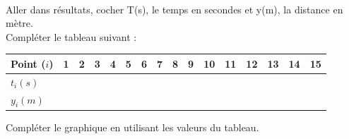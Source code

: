 \documentclass[11pt,a4paper]{article}
\renewcommand{\arraystretch}{1.5}
\begin{document}
\vfill 


\newpage


\\
 Aller dans résultats, cocher T(s), le temps en secondes et y(m), la distance en mètre. \\Compléter le tableau suivant : 

\begin{center}
    
\renewcommand{\arraystretch}{1.8}
    \begin{tabular}{|C{3cm}||C{0.5cm}|C{0.5cm}|C{0.5cm}|C{0.5cm}|C{0.5cm}|C{0.5cm}|C{0.5cm}|C{0.5cm}|C{0.5cm}|C{0.5cm}|C{0.5cm}|C{0.5cm}|C{0.5cm}|C{0.5cm}|C{0.5cm}|}
         \hline
         Point ($i$) & 1 &  2& 3 & 4 & 5 & 6& 7& 8& 9 & 10& 11 & 12 & 13 & 14 & 15\\
         \hline
         $t_i(s)$ &  &  &  &  &  & & & & & & & & & & \\
         \hline
          $y_i(m)$ &  &  &  & & & & & & & & & & & & \\
         \hline
 
    \end{tabular}

    \end{center}


 Compléter le graphique en utilisant les valeurs du tableau. 
\end{document}
